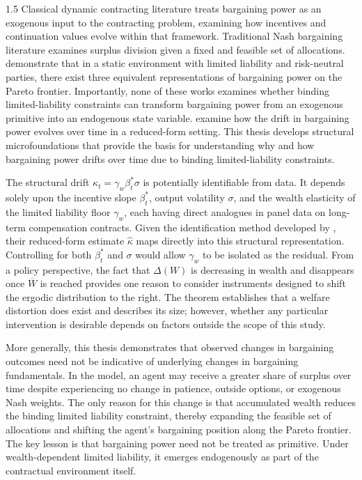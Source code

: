 \documentclass[12pt]{article}
\theoremstyle{definition}
\theoremstyle{plain}
\begin{document}
\begin{spacing}{1.5}
Classical dynamic contracting literature \parencite{holmstrom1979, spear1987, thomas1990} 
treats bargaining power as an exogenous input to the contracting problem, examining how 
incentives and continuation values evolve within that framework. Traditional Nash bargaining literature \parencite{nash1950, rubinstein1982, binmore1986} examines surplus 
division given a fixed and feasible set of allocations. \textcite{demougin2006} 
demonstrate that in a static environment with limited liability and risk-neutral parties, 
there exist three equivalent representations of bargaining power on the Pareto frontier. 
Importantly, none of these works examines whether binding limited-liability constraints 
can transform bargaining power from an exogenous primitive into an endogenous state 
variable. \textcite{digiannatale2025} examine how the drift in bargaining power evolves 
over time in a reduced-form setting. This thesis develops structural microfoundations 
that provide the basis for understanding why and how bargaining power drifts over time 
due to binding limited-liability constraints.

The structural drift $\kappa_t = \gamma_w \beta_t^* \sigma$ is potentially identifiable 
from data. It depends solely upon the incentive slope $\beta_t^*$, output volatility 
$\sigma$, and the wealth elasticity of the limited liability floor $\gamma_w$, each 
having direct analogues in panel data on long-term compensation contracts. Given the 
identification method developed by \textcite{digiannatale2025}, their reduced-form 
estimate $\hat{\kappa}$ maps directly into this structural representation. Controlling 
for both $\beta_t^*$ and $\sigma$ would allow $\gamma_w$ to be isolated as the residual. 
From a policy perspective, the fact that $\Delta(W)$ is decreasing in wealth and 
disappears once $\overline{W}$ is reached provides one reason to consider instruments 
designed to shift the ergodic distribution to the right. The theorem establishes that a 
welfare distortion does exist and describes its size; however, whether any particular 
intervention is desirable depends on factors outside the scope of this study.

More generally, this thesis demonstrates that observed changes in bargaining outcomes  need not be indicative of underlying changes in bargaining fundamentals. In the model,  an agent may receive a greater share of surplus over time despite experiencing no change  in patience, outside options, or exogenous Nash weights. The only reason for this change  is that accumulated wealth reduces the binding limited liability constraint, thereby  expanding the feasible set of allocations and shifting the agent's bargaining position  along the Pareto frontier. The key lesson is that bargaining power need not be treated  as primitive. Under wealth-dependent limited liability, it emerges endogenously as part of the contractual environment itself.
\newpage
{}
\printbibliography


\end{spacing}
\end{document}
